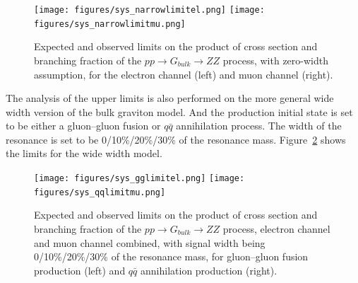 \begin{figure}[htbp]
\begin{center}
\texttt{[image: figures/sys\_narrowlimitel.png]}
\texttt{[image: figures/sys\_narrowlimitmu.png]}
\caption{Expected and observed limits on the product of cross section and branching fraction of the $pp\rightarrow G_{bulk}\rightarrow ZZ$ process, with zero-width assumption, for the electron channel (left) and muon channel (right).}
\label{fig:sys_narrowlimitselmu}
\end{center}
\end{figure}

\vspace{0.3cm}
The analysis of the upper limits is also performed on the more general wide width version of the bulk graviton model. And the production initial state is set to be either a gluon–gluon fusion or $q\bar{q}$ annihilation process. The width of the resonance is set to be 0/10\%/20\%/30\% of the resonance mass. Figure~\ref{fig:sys_ggqqlimits} shows the limits for the wide width model.

\begin{figure}[htbp]
\begin{center}
\texttt{[image: figures/sys\_gglimitel.png]}
\texttt{[image: figures/sys\_qqlimitmu.png]}
\caption{Expected and observed limits on the product of cross section and branching fraction of the $pp\rightarrow G_{bulk}\rightarrow ZZ$ process, electron channel and muon channel combined, with signal width being 0/10\%/20\%/30\% of the resonance mass, for gluon–gluon fusion production (left) and $q\bar{q}$ annihilation production (right).}
\label{fig:sys_ggqqlimits}
\end{center}
\end{figure}

